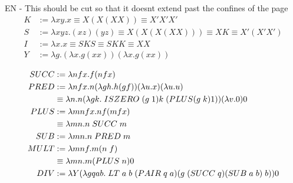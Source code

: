 EN - This should be cut so that it doesnt extend past the confines of the page
\[
    \begin{aligned}
        K &:= \lambda xy. x \equiv X(X (X X)) \equiv X' X' X'\\
        S &:= \lambda xyz. (x z) (y z) \equiv X (X (X (X X))) \equiv X K \equiv X' (X' X')\\
        I &:= \lambda x. x \equiv S K S \equiv S K K \equiv X X\\
        Y &:= \lambda g. (\lambda x. g (x x)) (\lambda x. g (x x))\\
    \end{aligned}
\]
\[
    \begin{aligned}
        SUCC &:= \lambda nfx. f (n f x)\\
        PRED &:= \lambda n fx. n (\lambda gh. h(g f)) (\lambda u. x) (\lambda u. u)\\
            &\equiv \lambda n. n (\lambda gk. \hspace{0.1cm} ISZERO \hspace{0.1cm} (g \hspace{0.1cm} 1) k \hspace{0.1cm} (PLUS (g \hspace{0.1cm}k) 1))  (\lambda v. 0) 0\\
        PLUS &:= \lambda mnfx. n f (m f x)\\
            &\equiv \lambda mn. n \hspace{0.1cm} SUCC \hspace{0.1cm} m\\
        SUB &:= \lambda mn. n \hspace{0.1cm} PRED \hspace{0.1cm} m\\
        MULT &:= \lambda mnf. m(n \hspace{0.1cm} f)\\
            &\equiv \lambda mn. m (PLUS \hspace{0.1cm} n) 0\\
        DIV &:= \lambda Y (\lambda gqab. \hspace{0.1cm} LT \hspace{0.1cm} a \hspace{0.1cm} b \hspace{0.1cm} (PAIR \hspace{0.1cm} q \hspace{0.1cm} a)(g \hspace{0.1cm} (SUCC \hspace{0.1cm} q) (SUB \hspace{0.1cm} a \hspace{0.1cm} b) \hspace{0.1cm} b)) 0\\

\end{aligned}\]

